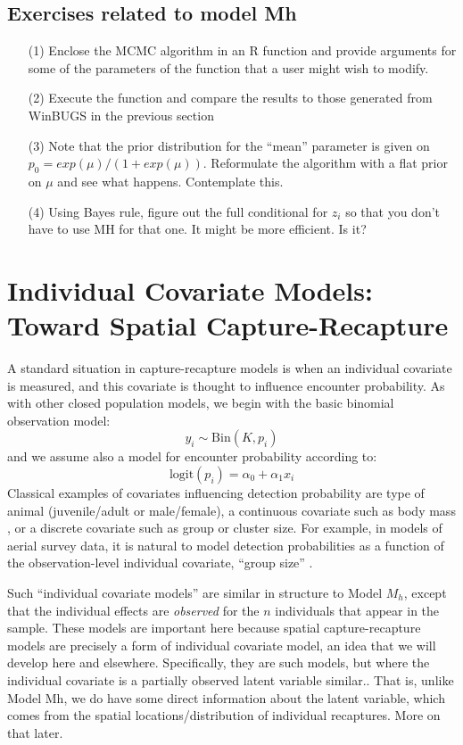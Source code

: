 \subsection{Exercises related to model Mh}

\begin{itemize}
\item[(1)] Enclose the MCMC algorithm in an R function and provide
  arguments for some of the parameters of the function that a user
  might wish to modify.
\item[(2)] Execute the function and compare the results to those
  generated from WinBUGS in the previous section
\item[(3)] Note that the prior distribution for the ``mean'' parameter
  is given on $p_0=exp(\mu)/(1+exp(\mu))$.  Reformulate the algorithm
  with a flat prior on $\mu$ and see what happens. Contemplate this.
\item[(4)] Using Bayes rule, figure out the full conditional for
  $z_{i}$ so that you don't have to use MH for that one. It might be
  more efficient. Is it?
\end{itemize}


\section{Individual Covariate Models: Toward Spatial Capture-Recapture}
\label{closed.sec.indcov}

A standard situation in capture-recapture models is when an individual
covariate is measured, and this covariate is thought to influence
encounter probability.  As with other closed population models, we
begin with the basic binomial observation model:
\[
y_{i} \sim \mbox{Bin}(K, p_{i})
\]
and we assume also  a model for encounter probability according to:
\[
 \mbox{logit}(p_{i}) = \alpha_{0} + \alpha_{1} x_{i}
\]
Classical examples of covariates influencing detection probability are
type of animal (juvenile/adult or male/female), a continuous covariate
such as body mass \citep[][chapt. 6]{royle_dorazio:2008}, or a
discrete covariate such as group or cluster size. For example, in
models of aerial survey data, it is natural to model detection
probabilities as a function of the observation-level individual
covariate, ``group size'' \citep{royle:2008, royle:2009,
  langtimm_etal:2010}.

Such ``individual covariate models'' are similar in structure to Model
$M_{h}$, except that the individual effects are {\it observed} for the
$n$ individuals that appear in the sample. These models are important
here because spatial capture-recapture models are precisely a form of
individual covariate model, an idea that we will develop here and
elsewhere. Specifically, they are such models, but where the
individual covariate is a partially observed latent variable similar..
That is, unlike Model Mh, we do have some direct information about the
latent variable, which comes from the spatial locations/distribution
of individual recaptures. More on that later.

